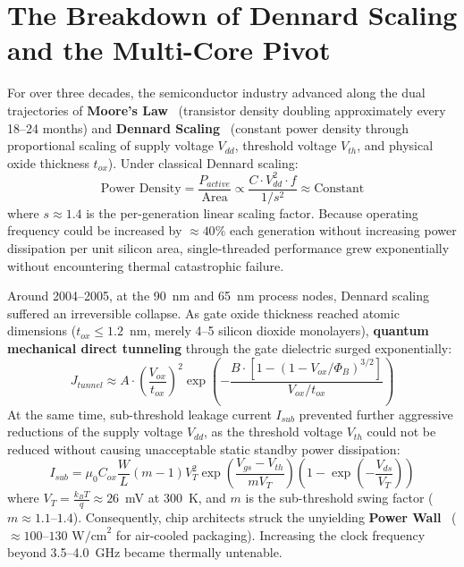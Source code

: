 \section{The Breakdown of Dennard Scaling and the Multi-Core Pivot}
\label{sec:ch1_dennard}

For over three decades, the semiconductor industry advanced along the dual trajectories of \textbf{Moore's Law}~\cite{Moore1965} (transistor density doubling approximately every 18--24 months) and \textbf{Dennard Scaling}~\cite{Dennard1974} (constant power density through proportional scaling of supply voltage $V_{dd}$, threshold voltage $V_{th}$, and physical oxide thickness $t_{ox}$). Under classical Dennard scaling:
\begin{equation}
\text{Power Density} = \frac{P_{active}}{\text{Area}} \propto \frac{C \cdot V_{dd}^2 \cdot f}{1 / s^2} \approx \text{Constant}
\label{eq:dennard_power}
\end{equation}
where $s \approx 1.4$ is the per-generation linear scaling factor. Because operating frequency could be increased by $\approx 40\%$ each generation without increasing power dissipation per unit silicon area, single-threaded performance grew exponentially without encountering thermal catastrophic failure.

Around 2004--2005, at the 90~nm and 65~nm process nodes, Dennard scaling suffered an irreversible collapse. As gate oxide thickness reached atomic dimensions ($t_{ox} \le 1.2$~nm, merely 4--5 silicon dioxide monolayers), \textbf{quantum mechanical direct tunneling} through the gate dielectric surged exponentially:
\begin{equation}
J_{tunnel} \approx A \cdot \left(\frac{V_{ox}}{t_{ox}}\right)^2 \exp\left(-\frac{B \cdot [1 - (1 - V_{ox}/\Phi_B)^{3/2}]}{V_{ox}/t_{ox}}\right)
\label{eq:tunneling}
\end{equation}
At the same time, sub-threshold leakage current $I_{sub}$ prevented further aggressive reductions of the supply voltage $V_{dd}$, as the threshold voltage $V_{th}$ could not be reduced without causing unacceptable static standby power dissipation:
\begin{equation}
I_{sub} = \mu_0 C_{ox} \frac{W}{L} (m-1) V_T^2 \exp\left(\frac{V_{gs} - V_{th}}{m V_T}\right) \left(1 - \exp\left(-\frac{V_{ds}}{V_T}\right)\right)
\label{eq:subthreshold}
\end{equation}
where $V_T = \frac{k_B T}{q} \approx 26$~mV at 300~K, and $m$ is the sub-threshold swing factor ($m \approx 1.1$--$1.4$). Consequently, chip architects struck the unyielding \textbf{Power Wall}~\cite{Borkar1999} ($\approx 100$--$130\text{ W/cm}^2$ for air-cooled packaging). Increasing the clock frequency beyond 3.5--4.0~GHz became thermally untenable.

